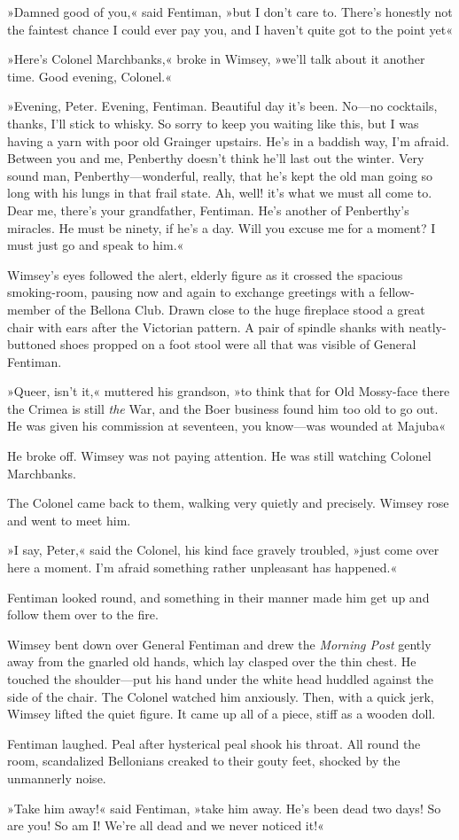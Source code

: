 »Damned good of you,« said Fentiman, »but I don't care to. There's honestly not the faintest chance I could ever pay you, and I haven't quite got to the point yet\longdash«

»Here's Colonel Marchbanks,« broke in Wimsey, »we'll talk about it another time. Good evening, Colonel.«

»Evening, Peter. Evening, Fentiman. Beautiful day it's been. No—no cocktails, thanks, I'll stick to whisky. So sorry to keep you waiting like this, but I was having a yarn with poor old Grainger upstairs. He's in a baddish way, I'm afraid. Between you and me, Penberthy doesn't think he'll last out the winter. Very sound man, Penberthy—wonderful, really, that he's kept the old man going so long with his lungs in that frail state. Ah, well! it's what we must all come to. Dear me, there's your grandfather, Fentiman. He's another of Penberthy's miracles. He must be ninety, if he's a day. Will you excuse me for a moment? I must just go and speak to him.«

Wimsey's eyes followed the alert, elderly figure as it crossed the spacious smoking-room, pausing now and again to exchange greetings with a fellow-member of the Bellona Club. Drawn close to the huge fireplace stood a great chair with ears after the Victorian pattern. A pair of spindle shanks with neatly-buttoned shoes propped on a foot stool were all that was visible of General Fentiman.

»Queer, isn't it,« muttered his grandson, »to think that for Old Mossy-face there the Crimea is still \textit{the} War, and the Boer business found him too old to go out. He was given his commission at seventeen, you know—was wounded at Majuba\longdash«

He broke off. Wimsey was not paying attention. He was still watching Colonel Marchbanks.

The Colonel came back to them, walking very quietly and precisely. Wimsey rose and went to meet him.

»I say, Peter,« said the Colonel, his kind face gravely troubled, »just come over here a moment. I'm afraid something rather unpleasant has happened.«

Fentiman looked round, and something in their manner made him get up and follow them over to the fire.

Wimsey bent down over General Fentiman and drew the \textit{Morning Post} gently away from the gnarled old hands, which lay clasped over the thin chest. He touched the shoulder—put his hand under the white head huddled against the side of the chair. The Colonel watched him anxiously. Then, with a quick jerk, Wimsey lifted the quiet figure. It came up all of a piece, stiff as a wooden doll.

Fentiman laughed. Peal after hysterical peal shook his throat. All round the room, scandalized Bellonians creaked to their gouty feet, shocked by the unmannerly noise.

»Take him away!« said Fentiman, »take him away. He's been dead two days! So are you! So am I! We're all dead and we never noticed it!«